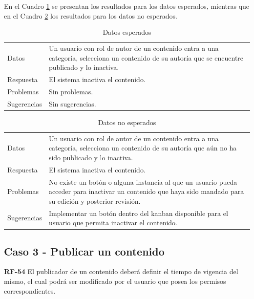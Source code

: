 \documentclass[10pt,times,twocolumn]{article}
\begin{document}
En el Cuadro \ref{tab:caso2_esperado} se presentan los resultados para los datos esperados, mientras que en el Cuadro \ref{tab:caso2_no_esperado} los resultados para los datos no esperados.

\begin{table}[H]
    \centering
    \begin{tabular}{p{3cm}p{4cm}}
        \rowcolor{gray!15}
        Datos & Un usuario con rol de autor de un contenido entra a una categoría, selecciona un contenido de su autoría que se encuentre publicado y lo inactiva.\\
       	Respuesta & El sistema inactiva el contenido.\\
       	Problemas & Sin problemas.\\
       	Sugerencias & Sin sugerencias.\\
    \end{tabular}
    \caption{Datos esperados}
    \label{tab:caso2_esperado}
\end{table}

\begin{table}[H]
    \centering
    \begin{tabular}{p{3cm}p{4cm}}
        \rowcolor{gray!15}
        Datos & Un usuario con rol de autor de un contenido entra a una categoría, selecciona un contenido de su autoría que aún no ha sido publicado y lo inactiva.\\
        Respuesta & El sistema inactiva el contenido.\\
       	Problemas & No existe un botón o alguna instancia al que un usuario pueda acceder para inactivar un contenido que haya sido mandado para su edición y posterior revisión.\\
       	Sugerencias & Implementar un botón dentro del kanban disponible para el usuario que permita inactivar el contenido.\\
    \end{tabular}
    \caption{Datos no esperados}
    \label{tab:caso2_no_esperado}
\end{table}

\subsection{Caso 3 - Publicar un contenido}

\textbf{RF-54} El publicador de un contenido deberá definir el tiempo de vigencia del mismo, el  cual podrá ser modificado por el usuario que posea los permisos correspondientes.
\end{document}
